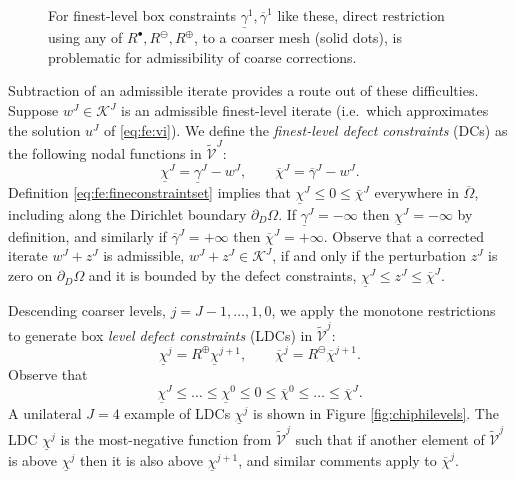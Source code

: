 \documentclass[letterpaper,final,12pt,reqno]{amsart}
\theoremstyle{cstyle}
\theoremstyle{cstyle*}
\theoremstyle{dstyle}
\numberwithin{equation}{section}
\numberwithin{figure}{section}
\numberwithin{table}{section}
\numberwithin{theorem}{section}
\newcommand{\cK}{\mathcal{K}}
\newcommand{\maxR}{R^{\bm{\oplus}}}
\newcommand{\minR}{R^{\bm{\ominus}}}
\newcommand{\iR}{R^{\bullet}}
\begin{document}
\begin{figure}[ht]
\begin{center}

\end{center}
\caption{For finest-level box constraints $\underline{\gamma}^1,\overline{\gamma}^1$ like these, direct restriction using any of $\iR,\minR,\maxR$, to a coarser mesh (solid dots), is problematic for admissibility of coarse corrections.}
\label{fig:directRbad}
\end{figure}

Subtraction of an admissible iterate provides a route out of these difficulties.  Suppose $w^J \in \cK^J$ is an admissible finest-level iterate (i.e.~which approximates the solution $u^J$ of \eqref{eq:fe:vi}).  We define the \emph{finest-level defect constraints} (DCs) \cite{GraeserKornhuber2009} as the following nodal functions in $\tilde{\mathcal{V}}^J$:
\begin{equation}
\underline{\chi}^J = \underline{\gamma}^J - w^J, \qquad \overline{\chi}^J = \overline{\gamma}^J - w^J. \label{eq:fe:defectconstraints}
\end{equation}
Definition \eqref{eq:fe:fineconstraintset} implies that $\underline{\chi}^J \le 0 \le \overline{\chi}^J$ everywhere in $\overline{\Omega}$, including along the Dirichlet boundary $\partial_D\Omega$.  If $\underline{\gamma}^J=-\infty$ then $\underline{\chi}^J=-\infty$ by definition, and similarly if $\overline{\gamma}^J=+\infty$ then $\overline{\chi}^J=+\infty$.  Observe that a corrected iterate $w^J + z^J$ is admissible, $w^J + z^J \in \cK^J$, if and only if the perturbation $z^J$ is zero on $\partial_D\Omega$ and it is bounded by the defect constraints, $\underline{\chi}^J \le z^J \le \overline{\chi}^J$.

Descending coarser levels, $j=J-1,\dots,1,0$, we apply the monotone restrictions to generate box \emph{level defect constraints} (LDCs) in $\tilde{\mathcal{V}}^j$:
\begin{equation}
\underline{\chi}^{j} = \maxR \underline{\chi}^{j+1}, \qquad \overline{\chi}^{j} = \minR \overline{\chi}^{j+1}. \label{eq:fe:chilevels}
\end{equation}
Observe that
\begin{equation}
\underline{\chi}^{J} \le \dots \le \underline{\chi}^0 \le 0 \le \overline{\chi}^0 \le \dots \le \overline{\chi}^J. \label{eq:fe:chiordering}
\end{equation}
A unilateral $J=4$ example of LDCs $\underline{\chi}^j$ is shown in Figure \ref{fig:chiphilevels}.  The LDC $\underline{\chi}^j$ is the most-negative function from $\tilde{\mathcal{V}}^j$ such that if another element of $\tilde{\mathcal{V}}^j$ is above $\underline{\chi}^j$ then it is also above $\underline{\chi}^{j+1}$, and similar comments apply to $\overline{\chi}^{j}$.
\end{document}
